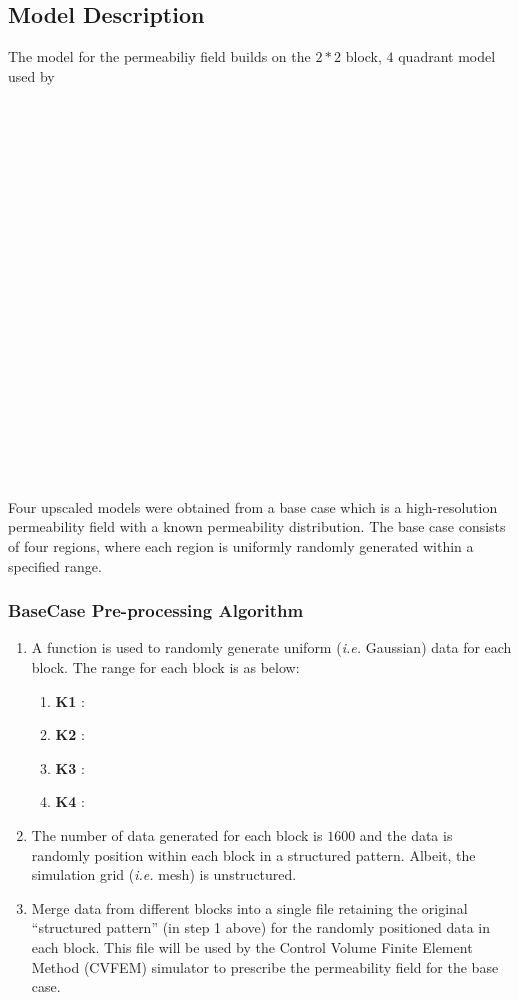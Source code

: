 \documentclass[preprint,12pt]{elsarticle}
\begin{document}
\subsection{Model Description}\label{subsection:model}
The model for the permeabiliy field builds on the $2 * 2$ block, $4$ quadrant model used by 
\\
\\
\\
\\
\\
\\
\\
\\
\\
\\
\\
\\
\\
\\
\\
\\
\\
\\
\\
\\
\\
\\ 

Four upscaled models were obtained from a base case which is a high-resolution permeability field with a known permeability distribution. The base case consists of four regions, where each region is uniformly randomly generated within a specified range. 


\subsubsection{BaseCase Pre-processing Algorithm}\label{subsubsection:basecase_preprocess_algorithm}
\begin{enumerate}[1]
  \item A function is used to randomly generate uniform ({\it i.e.} Gaussian) data for each block. The range for each block is as below:
  \begin{enumerate}[a]
    \item \textbf{K1} :
    \item \textbf{K2} :
    \item \textbf{K3} :
    \item \textbf{K4} : 
  \end{enumerate}                                                    
  \item The number of data generated for each block is $1600$ and the data is randomly position within each block in a structured pattern. Albeit, the simulation grid ({\it i.e.} mesh) is unstructured.
  \item Merge data from different blocks into a single file retaining the original ``structured pattern'' (in step 1 above) for the randomly positioned data in each block. This file will be used by the Control Volume Finite Element Method (CVFEM) simulator to prescribe the permeability field for the base case.
\end{enumerate}
\end{document}
